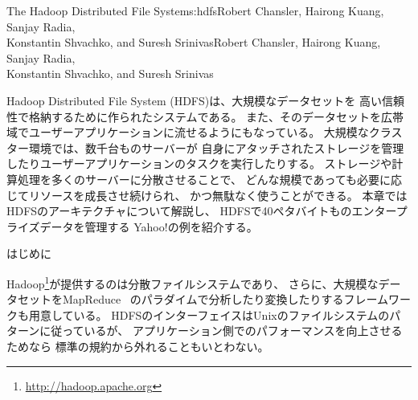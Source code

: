 \begin{aosachaptertoc}{The Hadoop Distributed File System}{s:hdfs}{Robert Chansler, Hairong Kuang, Sanjay Radia, \\ Konstantin Shvachko, and Suresh Srinivas}{Robert Chansler, Hairong Kuang, Sanjay Radia, \\ \hspace*{0.9cm} Konstantin Shvachko, and Suresh Srinivas}

Hadoop Distributed File System (HDFS)は、大規模なデータセットを
高い信頼性で格納するために作られたシステムである。
また、そのデータセットを広帯域でユーザーアプリケーションに流せるようにもなっている。
大規模なクラスター環境では、数千台ものサーバーが
自身にアタッチされたストレージを管理したりユーザーアプリケーションのタスクを実行したりする。
ストレージや計算処理を多くのサーバーに分散させることで、
どんな規模であっても必要に応じてリソースを成長させ続けられ、
かつ無駄なく使うことができる。
本章ではHDFSのアーキテクチャについて解説し、
HDFSで40ペタバイトものエンタープライズデータを管理する
Yahoo!の例を紹介する。

\begin{aosasect1}{はじめに}

Hadoop\footnote{\url{http://hadoop.apache.org}}が提供するのは分散ファイルシステムであり、
さらに、大規模なデータセットをMapReduce~\cite{bib:dean:mapreduce}
のパラダイムで分析したり変換したりするフレームワークも用意している。
HDFSのインターフェイスはUnixのファイルシステムのパターンに従っているが、
アプリケーション側でのパフォーマンスを向上させるためなら
標準の規約から外れることもいとわない。


\end{aosasect1}
\end{aosachaptertoc}
